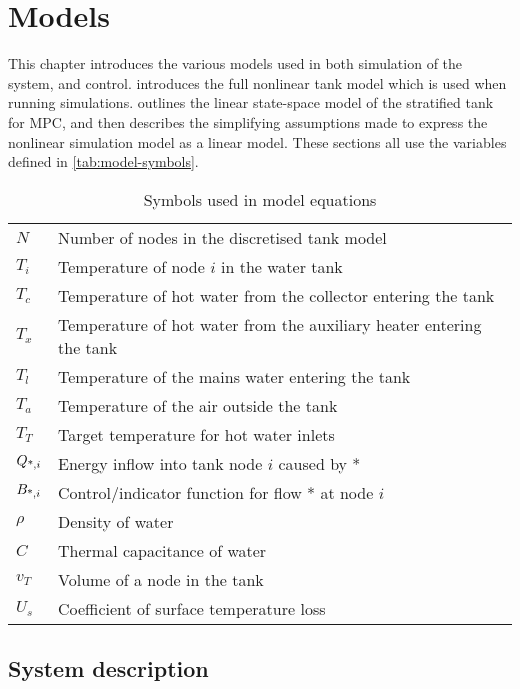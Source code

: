 \chapter{Models}
\label{ch:models}

This chapter introduces the various models used in both simulation of the system, and control.
 introduces the full nonlinear tank model which is used when running simulations.
 outlines the linear state-space model of the stratified tank for MPC, and then describes the simplifying assumptions made to express the nonlinear simulation model as a linear model.
These sections all use the variables defined in \autoref{tab:model-symbols}.

\begin{table}
   \caption{Symbols used in model equations}
   \label{tab:model-symbols}
   \begin{center}
   \begin{tabular}{l l}
      \toprule
      $N$ & Number of nodes in the discretised tank model \\
      $T_i$ & Temperature of node $i$ in the water tank \\
      $T_c$ & Temperature of hot water from the collector entering the tank \\
      $T_x$ & Temperature of hot water from the auxiliary heater entering the tank \\
      $T_l$ & Temperature of the mains water entering the tank \\
      $T_a$ & Temperature of the air outside the tank \\
      $T_T$ & Target temperature for hot water inlets \\
      $Q_{\text{*}, i}$ & Energy inflow into tank node $i$ caused by * \\
      $B_{\text{*}, i}$ & Control/indicator function for flow * at node $i$ \\
      $\rho$ & Density of water \\
      $C$ & Thermal capacitance of water \\
      $v_T$ & Volume of a node in the tank \\
      $U_s$ & Coefficient of surface temperature loss \\
      \bottomrule
   \end{tabular}
   \end{center}
\end{table}

\section{System description}
\label{sec:model:system}

